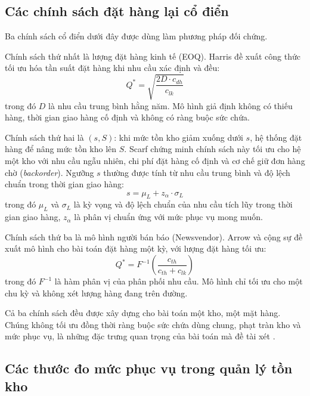 \subsection{Các chính sách đặt hàng lại cổ điển}
\label{subsec:chinhSachCoDien}

Ba chính sách cổ điển dưới đây được dùng làm phương pháp đối chứng.

Chính sách thứ nhất là lượng đặt hàng kinh tế (EOQ). Harris \cite{harris1913} đề xuất công thức tối ưu hóa tần suất đặt hàng khi nhu cầu xác định và đều:
\begin{equation}
    Q^* = \sqrt{\frac{2 D \cdot c_{dh}}{c_{lk}}}
    \label{eq:eoq}
\end{equation}
trong đó $D$ là nhu cầu trung bình hằng năm. Mô hình giả định không có thiếu hàng, thời gian giao hàng cố định và không có ràng buộc sức chứa.

Chính sách thứ hai là $(s, S)$: khi mức tồn kho giảm xuống dưới $s$, hệ thống đặt hàng để nâng mức tồn kho lên $S$. Scarf \cite{scarf1960} chứng minh chính sách này tối ưu cho hệ một kho với nhu cầu ngẫu nhiên, chi phí đặt hàng cố định và cơ chế giữ đơn hàng chờ (\textit{backorder}). Ngưỡng $s$ thường được tính từ nhu cầu trung bình và độ lệch chuẩn trong thời gian giao hàng:
\begin{equation}
    s = \mu_L + z_\alpha \cdot \sigma_L
    \label{eq:sSPolicy}
\end{equation}
trong đó $\mu_L$ và $\sigma_L$ là kỳ vọng và độ lệch chuẩn của nhu cầu tích lũy trong thời gian giao hàng, $z_\alpha$ là phân vị chuẩn ứng với mức phục vụ mong muốn.

Chính sách thứ ba là mô hình người bán báo (Newsvendor). Arrow và cộng sự \cite{arrow1951} đề xuất mô hình cho bài toán đặt hàng một kỳ, với lượng đặt hàng tối ưu:
\begin{equation}
    Q^* = F^{-1}\!\left(\frac{c_{th}}{c_{th} + c_{lk}}\right)
    \label{eq:newsvendor}
\end{equation}
trong đó $F^{-1}$ là hàm phân vị của phân phối nhu cầu. Mô hình chỉ tối ưu cho một chu kỳ và không xét lượng hàng đang trên đường.

Cả ba chính sách đều được xây dựng cho bài toán một kho, một mặt hàng. Chúng không tối ưu đồng thời ràng buộc sức chứa dùng chung, phạt tràn kho và mức phục vụ, là những đặc trưng quan trọng của bài toán mà đề tài xét \parencite{zipkin2000, silver2016}.

\subsection{Các thước đo mức phục vụ trong quản lý tồn kho}
\label{subsec:thuocDoMucPhucVu}

